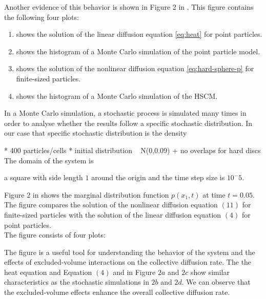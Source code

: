 Another evidence of this behavior is shown in Figure 2 in \cite{Bruna2012}. 
This figure contains the following four plots:
\begin{enumerate}[label=(\alph*)]
    \item shows the solution of the linear diffusion equation \ref{eq:heat} for point particles.
    \item shows the histogram of a Monte Carlo simulation of the point particle model.
    \item shows the solution of the nonlinear diffusion equation \ref{eq:hard-sphere-p} for finite-sized particles.
    \item shows the histogram of a Monte Carlo simulation of the HSCM. 
\end{enumerate} 
In a Monte Carlo simulation, a stochastic process is simulated many times in order to analyse whether the results follow a specific stochastic distribution.
In our case that specific stochastic distribution is the density 

* 400 particles/cells 
* initial distribution ~ N(0,0.09) + no overlaps for hard discs 
The domain of the system is 

a square with side length $1$ around the origin
and the time step size is $10^-5$. 

Figure $2$ in \cite{Bruna2012} shows the marginal distribution function $p(x_1, t)$ at time $t = 0.05$. 
The figure compares the solution of the nonlinear diffusion equation $(11)$ for finite-sized particles with the solution of the linear diffusion equation $(4)$ for point particles. \\
The figure consists of four plots:

The figure is a useful tool for understanding the behavior of the system and the effects of excluded-volume interactions on the collective diffusion rate.
The the heat equation and Equation $(4)$ and in Figure $2a$ and $2c$ show similar characteristics as the stochastic simulations in $2b$ and $2d$. 
We can observe that the excluded-volume effects enhance the overall collective diffusion rate.

